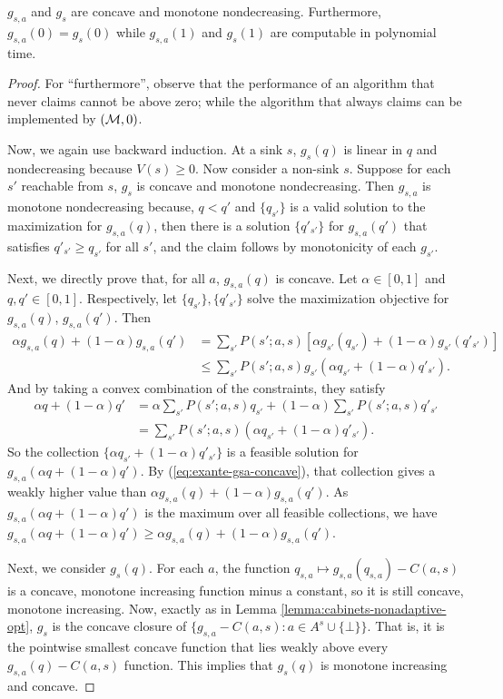 \begin{lemma} \label{lemma:exante-g-concave}
  $g_{s,a}$ and $g_s$ are concave and monotone nondecreasing.
  Furthermore, $g_{s,a}(0) = g_s(0)$ while $g_{s,a}(1)$ and $g_s(1)$ are computable in polynomial time.
\end{lemma}
\begin{proof}
  For ``furthermore'', observe that the performance of an algorithm that never claims cannot be above zero; while the algorithm that always claims can be implemented by \SAUP{}$(\mathcal{M},0)$.
  

  Now, we again use backward induction.
  At a sink $s$, $g_s(q)$ is linear in $q$ and nondecreasing because $V(s) \geq 0$.
  Now consider a non-sink $s$.
  Suppose for each $s'$ reachable from $s$, $g_s$ is concave and monotone nondecreasing.
  Then $g_{s,a}$ is monotone nondecreasing because, $q < q'$ and $\{q_{s'}\}$ is a valid solution to the maximization for $g_{s,a}(q)$, then there is a solution $\{q'_{s'}\}$ for $g_{s,a}(q')$ that satisfies $q'_{s'} \geq q_{s'}$ for all $s'$, and the claim follows by monotonicity of each $g_{s'}$.

  Next, we directly prove that, for all $a$, $g_{s,a}(q)$ is concave.
  Let $\alpha \in [0,1]$ and $q,q' \in [0,1]$.
  Respectively, let $\{q_{s'}\},\{q'_{s'}\}$ solve the maximization objective for $g_{s,a}(q)$, $g_{s,a}(q')$.
  Then
  \begin{align}
    \alpha g_{s,a}(q) + (1-\alpha) g_{s,a}(q')
    &= \sum_{s'} P(s';a,s) \left[ \alpha g_{s'}(q_{s'}) + (1-\alpha) g_{s'}(q'_{s'}) \right]  \nonumber \\
    &\leq \sum_{s'} P(s';a,s) g_{s'}(\alpha q_{s'} + (1-\alpha) q'_{s'}) .  \label{eq:exante-gsa-concave}
  \end{align}
  And by taking a convex combination of the constraints, they satisfy
  \begin{align*}
    \alpha q + (1-\alpha)q'
    &= \alpha \sum_{s'} P(s';a,s) q_{s'} + (1-\alpha) \sum_{s'} P(s';a,s) q'_{s'}  \\
    &= \sum_{s'} P(s';a,s) \left(\alpha q_{s'} + (1-\alpha) q'_{s'} \right) .
  \end{align*}
  So the collection $\{\alpha q_{s'} + (1-\alpha) q'_{s'}\}$ is a feasible solution for $g_{s,a}(\alpha q + (1-\alpha)q')$.
  By (\ref{eq:exante-gsa-concave}), that collection gives a weakly higher value than $\alpha g_{s,a}(q) + (1-\alpha)g_{s,a}(q')$.
  As $g_{s,a}(\alpha q + (1-\alpha)q')$ is the maximum over all feasible collections, we have $g_{s,a}(\alpha q + (1-\alpha)q') \geq \alpha g_{s,a}(q) + (1-\alpha)g_{s,a}(q')$.
  
  Next, we consider $g_s(q)$.
  For each $a$, the function $q_{s,a} \mapsto g_{s,a}(q_{s,a}) - C(a,s)$ is a concave, monotone increasing function minus a constant, so it is still concave, monotone increasing.
  Now, exactly as in Lemma \ref{lemma:cabinets-nonadaptive-opt}, $g_s$ is the concave closure of $\{g_{s,a} - C(a,s) : a \in A^s \cup \{\bot\}\}$.
  That is, it is the pointwise smallest concave function that lies weakly above every $g_{s,a}(q) - C(a,s)$ function.
  This implies that $g_s(q)$ is monotone increasing and concave.
\end{proof}


